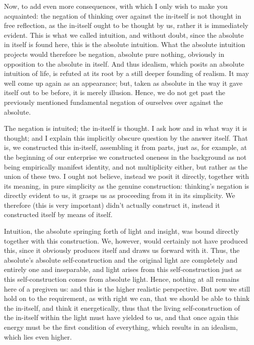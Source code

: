 Now, to add even more consequences,
with which I only wish to make you acquainted:
the negation of thinking over against the in-itself
is not thought in free reflection,
as the in-itself ought to be thought by us,
rather it is immediately evident.
This is what we called intuition, and without doubt,
since the absolute in itself is found here,
this is the absolute intuition.
What the absolute intuition projects
would therefore be negation, absolute pure nothing,
obviously in opposition to the absolute in itself.
And thus idealism, which posits an absolute intuition of life, is
refuted at its root by a still deeper founding of realism.
It may well come up again as an appearance;
but, taken as absolute in the way it gave itself
out to be before, it is merely illusion.
Hence, we do not get past the previously mentioned
fundamental negation of ourselves over against the absolute.

The negation is intuited;
the in-itself is thought.
I ask how and in what way it is thought;
and I explain this implicitly obscure question
by the answer itself.
That is, we constructed this in-itself,
assembling it from parts, just as, for example,
at the beginning of our enterprise we constructed
oneness in the background as not being
empirically manifest identity,
and not multiplicity either,
but rather as the union of these two.
I ought not believe, instead we posit it directly,
together with its meaning,
in pure simplicity as the genuine construction:
thinking's negation is directly evident to us,
it grasps us as proceeding from it in its simplicity.
We therefore (this is very important)
didn't actually construct it,
instead it constructed itself
by means of itself.

Intuition, the absolute springing forth of light and insight,
was bound directly together with this construction.
We, however, would certainly not have produced this,
since it obviously produces itself and draws us forward with it.
Thus, the absolute's absolute self-construction
and the original light are completely and entirely one and inseparable,
and light arises from this self-construction
just as this self-construction comes from absolute light.
Hence, nothing at all remains here of a pregiven us:
and this is the higher realistic perspective.
But now we still hold on to the requirement, as with right we can,
that we should be able to think the in-itself,
and think it energetically,
thus that the living self-construction of
the in-itself within the light must have yielded to us,
and that once again this energy must be
the first condition of everything,
which results in an idealism,
which lies even higher.

